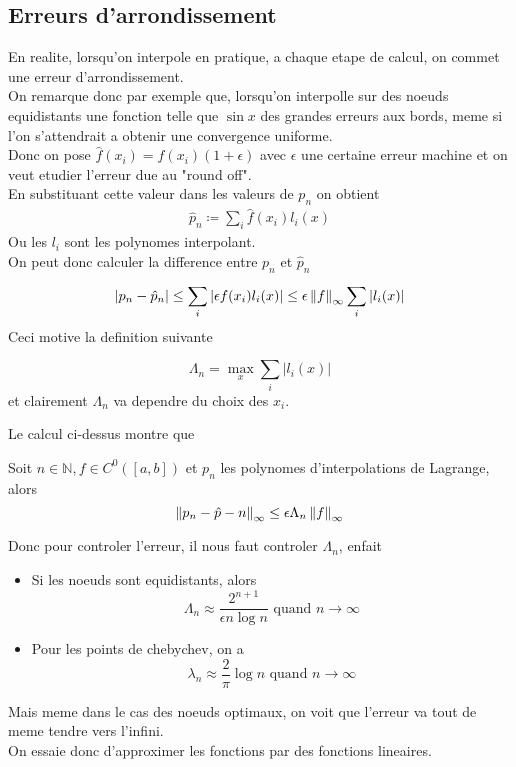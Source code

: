 \documentclass[../main.tex]{subfiles}
\begin{document}
\subsection{Erreurs d'arrondissement}
En realite, lorsqu'on interpole en pratique, a chaque etape de calcul, on commet une erreur d'arrondissement.\\
On remarque donc par exemple que, lorsqu'on interpolle sur des noeuds equidistants une fonction telle que $\sin x$ des grandes erreurs aux bords, meme si l'on s'attendrait a obtenir une convergence uniforme.\\
Donc on pose $ \hat{f} ( x_i) = f( x_i) ( 1+ \epsilon) $ avec $\epsilon$ une certaine erreur machine et on veut etudier l'erreur due au "round off".\\
En substituant cette valeur dans les valeurs de $ p_n$ on obtient
\begin{align*}
\hat{p}_n \coloneqq \sum_{i}^{ } \hat{f}( x_i)  l_i( x) 
\end{align*}
Ou les $l_i$ sont les polynomes interpolant.\\
On peut donc calculer la difference entre $p_n$ et $ \hat{p}_n$ 
\begin{align*}
| p_n - \hat{p}_n | \leq   \sum_{i}^{ } |\epsilon f( x_i) l_i( x) | \leq  \epsilon \left\lVert f\right\rVert_{\infty}   \sum_{i}^{ } |l_i( x) |	
\end{align*}
Ceci motive la definition suivante
\begin{defn}
	\[ 
	\Lambda_n = \max_{x} \sum_i |l_i( x) |
	\]
	et clairement $\Lambda_n$ va dependre du choix des $x_i$.
\end{defn}
Le calcul ci-dessus montre que
\begin{thm}
	Soit $ n \in \mathbb{N}, f\in C^{0}( [ a,b] ) $ et $p_n$ les polynomes d'interpolations de Lagrange, alors
	\[ 
	\left\lVert p_n - \hat{p}-n\right\rVert _{ \infty } \leq \epsilon \Lambda_n \left\lVert f\right\rVert _{ \infty } 	
	\]
	
\end{thm}
Donc pour controler l'erreur, il nous faut controler $ \Lambda_n$, enfait
\begin{thm}
	\begin{itemize}
	\item Si les noeuds sont equidistants, alors
		\[ 
		\Lambda_n \approx \frac{2^{n+1}}{\epsilon n \log n} \text{ quand }  n \to \infty 
		\]
		
	\item Pour les points de chebychev, on a
		\[ 
		\lambda_n \approx \frac{2}{\pi} \log n \text{ quand } n \to \infty 		
		\]
	\end{itemize}
\end{thm}
Mais meme dans le cas des noeuds optimaux, on voit que l'erreur va tout de meme tendre vers l'infini.\\
On essaie donc d'approximer les fonctions par des fonctions lineaires.
\end{document}
